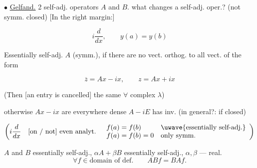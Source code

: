 $\bullet$ \underline{Gelfand.}
2 self-adj. operators $A$ and $B$.
what changes a self-adj. oper.? (not symm. closed)
[In the right margin:]
\par\noindent\begin{minipage}{\linewidth}
\begin{equation*}
i\frac d{dx},\qquad y(a)=y(b)
\end{equation*}
\end{minipage}\par
Essentially self-adj. $A$ (symm.), if
there are no vect. orthog. to all vect. of the form
\par\noindent\begin{minipage}{\linewidth}
\begin{equation*}
\overline z=Ax-ix,\qquad z=Ax+ix
\end{equation*}
\end{minipage}\par
\par\noindent\begin{minipage}{\linewidth}
(Then [an entry is cancelled] the same $\forall$ complex $\lambda$)
\end{minipage}\par
otherwise $Ax-ix$ are everywhere dense
$A-iE$ has inv. (in general?: if closed)
\par\noindent\begin{minipage}{\linewidth}
\begin{equation*}
\left(i\frac d{dx}\quad\text{[on / not] even analyt.}\quad
\begin{array}{ll}
f(a)=f(b)&\text{\uwave{essentially self-adj.}}\\
f(a)=f(b)=0&\text{only symm.}
\end{array}\right)
\end{equation*}
\end{minipage}\par
$A$ and $B$ essentially self-adj.,
$\alpha A+\beta B$ essentially self-adj.,
$\alpha,\beta$ --- real.
\begin{equation*}
\forall f\in\text{domain of def.}\qquad ABf=BAf.
\end{equation*}
